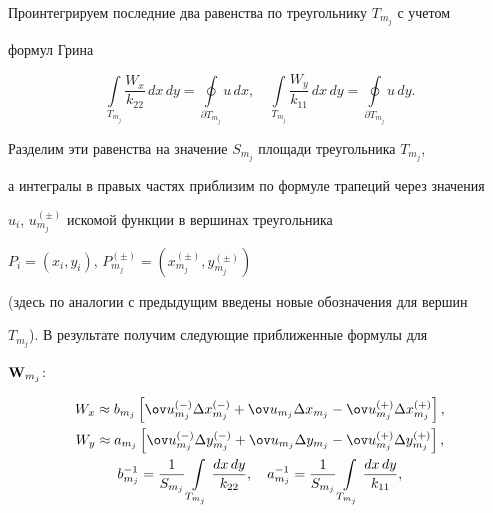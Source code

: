 Проинтегрируем последние два равенства по треугольнику $T_{m_j}$ с учетом


формул Грина


$$


\int\limits_{T_{m_j}} \frac{W_x}{k_{22}}\,dx\,dy = 


\oint\limits_{\partial T_{m_j}} u\, dx, \quad


\int\limits_{T_{m_j}} \frac{W_y}{k_{11}}\,dx\,dy = 


\oint\limits_{\partial T_{m_j}} u\, dy.


$$


Разделим эти равенства на значение $S_{m_j}$ площади треугольника $T_{m_j}$,


а интегралы в правых частях приблизим по формуле трапеций через значения


$u_i$, $u_{m_j}^{(\pm)}$ искомой функции в вершинах треугольника 


$P_i=(x_i,y_i)$, $P_{m_j}^{(\pm)}=(x_{m_j}^{(\pm)},y_{m_j}^{(\pm)})$


(здесь по аналогии с предыдущим введены новые обозначения для вершин


$T_{m_j}$). В результате получим следующие приближенные формулы для


${\bold W}_{m_j}$:


\begin{gather}


W_x \approx b_{m_j}\left[


\ov u_{m_j}^{(-)}\Delta x_{m_j}^{(-)} +


\ov u_{m_j}\Delta x_{m_j} -


\ov u_{m_j}^{(+)}\Delta x_{m_j}^{(+)}\right],\notag \\


%


\lEq{12}


W_y \approx a_{m_j}\left[


\ov u_{m_j}^{(-)}\Delta y_{m_j}^{(-)} +


\ov u_{m_j}\Delta y_{m_j} -


\ov u_{m_j}^{(+)}\Delta y_{m_j}^{(+)}\right], \\


%


b_{m_j}^{-1} = \frac{1}{S_{m_j}}\int\limits_{T_{m_j}}


\frac{dx\,dy}{k_{22}}, \quad


a_{m_j}^{-1} = \frac{1}{S_{m_j}}\int\limits_{T_{m_j}}


\frac{dx\,dy}{k_{11}}, \notag


\end{gather}


